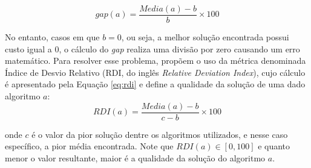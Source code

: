\documentclass[12pt,fleqn]{article}
\begin{document}
\begin{equation}
    gap(a) = \frac{Media(a) - b}{b} \times 100
    \label{eq:gap}
\end{equation}

No entanto, casos em que $b = 0$, ou seja, a melhor solução encontrada possui custo igual a 0, o cálculo do \textit{gap} realiza uma divisão por zero causando um erro matemático. Para resolver esse problema, \cite{vallada2008minimising} propõem o uso da métrica denominada Índice de Desvio Relativo (RDI, do inglês \textit{Relative Deviation Index}), cujo cálculo é apresentado pela Equação \ref{eq:rdi} e define a qualidade da  solução de uma dado algoritmo $a$:
\begin{equation}
    RDI(a) = \frac{Media(a) - b}{c - b} \times 100
    \label{eq:rdi}
\end{equation}

onde $c$ é o valor da pior solução dentre os algoritmos utilizados, e nesse caso específico, a pior média encontrada. Note que $RDI(a) \in [0,100]$ e quanto menor o valor resultante, maior é a qualidade da solução do algoritmo $a$.
\end{document}
